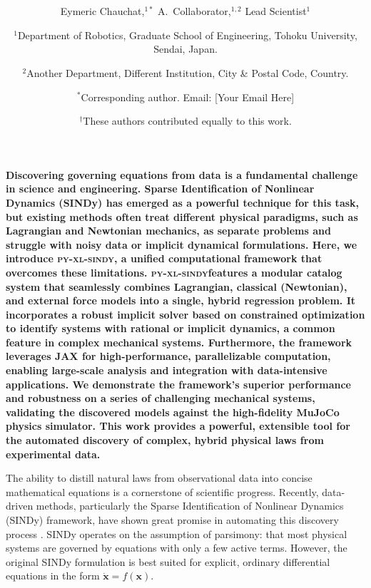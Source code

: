 \documentclass[12pt]{article}
\date{}
\title{\bfseries \boldmath \scititle}
\author{
	Eymeric Chauchat,$^{1\ast}$
	A.~Collaborator,$^{1,2}$
	Lead Scientist$^{1}$\and
	\small$^{1}$Department of Robotics, Graduate School of Engineering, Tohoku University, Sendai, Japan.\and
	\small$^{2}$Another Department, Different Institution, City \& Postal Code, Country.\and
	\small$^\ast$Corresponding author. Email: [Your Email Here]\and
	\small$^\dagger$These authors contributed equally to this work.
}
\renewenvironment{abstract}
	{\quotation}
	{\endquotation}
\newcommand{\frameworkname}{\textsc{py-xl-sindy}}
\begin{document}
 

\maketitle

\begin{abstract} \bfseries \boldmath
Discovering governing equations from data is a fundamental challenge in science and engineering. Sparse Identification of Nonlinear Dynamics (SINDy) has emerged as a powerful technique for this task, but existing methods often treat different physical paradigms, such as Lagrangian and Newtonian mechanics, as separate problems and struggle with noisy data or implicit dynamical formulations. Here, we introduce \frameworkname, a unified computational framework that overcomes these limitations. \frameworkname features a modular catalog system that seamlessly combines Lagrangian, classical (Newtonian), and external force models into a single, hybrid regression problem. It incorporates a robust implicit solver based on constrained optimization to identify systems with rational or implicit dynamics, a common feature in complex mechanical systems. Furthermore, the framework leverages JAX for high-performance, parallelizable computation, enabling large-scale analysis and integration with data-intensive applications. We demonstrate the framework's superior performance and robustness on a series of challenging mechanical systems, validating the discovered models against the high-fidelity MuJoCo physics simulator. This work provides a powerful, extensible tool for the automated discovery of complex, hybrid physical laws from experimental data.
\end{abstract}


\noindent
The ability to distill natural laws from observational data into concise mathematical equations is a cornerstone of scientific progress. Recently, data-driven methods, particularly the Sparse Identification of Nonlinear Dynamics (SINDy) framework, have shown great promise in automating this discovery process \cite{Brunton2016_SINDy}. SINDy operates on the assumption of parsimony: that most physical systems are governed by equations with only a few active terms. However, the original SINDy formulation is best suited for explicit, ordinary differential equations in the form $\dot{\mathbf{x}} = f(\mathbf{x})$.
\end{document}
